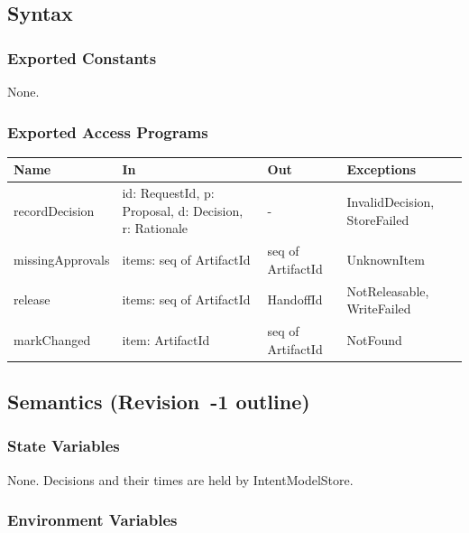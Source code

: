 \documentclass[12pt, titlepage]{article}
\begin{document}
\subsection{Syntax}

\subsubsection{Exported Constants}

None.

\subsubsection{Exported Access Programs}

\begin{center}
\small
\begin{tabular}{>{\raggedright\arraybackslash}p{3.7cm} >{\raggedright\arraybackslash}p{3.8cm} >{\raggedright\arraybackslash}p{3.6cm} >{\raggedright\arraybackslash}p{3.7cm}}
\hline
\textbf{Name} & \textbf{In} & \textbf{Out} & \textbf{Exceptions} \\
\hline
recordDecision & id: RequestId, p: Proposal, d: Decision, r: Rationale & - & InvalidDecision, StoreFailed \\
missingApprovals & items: seq of ArtifactId & seq of ArtifactId & UnknownItem \\
release & items: seq of ArtifactId & HandoffId & NotReleasable, WriteFailed \\
markChanged & item: ArtifactId & seq of ArtifactId & NotFound \\
\hline
\end{tabular}
\end{center}

\subsection{Semantics (Revision~-1 outline)}

\subsubsection{State Variables}

None. Decisions and their times are held by IntentModelStore.

\subsubsection{Environment Variables}
\end{document}
